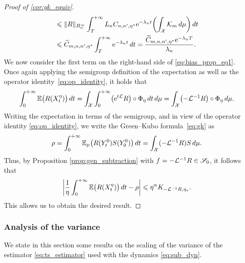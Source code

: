 \begin{proof}[Proof of \cref{cor:gk_equiv}]
\begin{align}
		&\leq \norm{R}_{B^\infty_n}\int_T^{+\infty} L_n C_{n,n',\eta^*} \e^{-\lambda_n t} \paren*{\int_\mathcal{X} \mathcal{K}_m \, d\mu} \, dt \\
		&\leq \widetilde{C}_{m,n,n',\eta^*}\int_T^{+\infty} \e^{-\lambda_n t} \, dt %
		= \frac{\widetilde{C}_{m,n,n',\eta^*}\e^{-\lambda_n T}}{\lambda_n}. %
	\end{align}
	We now consider the first term on the right-hand side of \eqref{eq:bias_prop_eq1}. 
	Once again applying the semigroup definition of the expectation as well as the operator identity~\eqref{eq:op_identity}, it holds that
	\begin{align}
		\int_0^{+\infty} \E\bigl(R(X^\eta_t)\bigr) \, dt %
		= \int_\mathcal{X}\int_0^{+\infty} \bigl(\e^{t\L}R\bigr)\circ \Phi_\eta \, dt \, d\mu
		= \int_\mathcal{X} \bigl(-\L^{-1}R\bigr)\circ \Phi_\eta \, d\mu.
		\label{eq:cor_Tint_to_LinvR}
	\end{align}
	Writing the expectation in terms of the semigroup, and in view of the operator identity \eqref{eq:op_identity}, we write the Green--Kubo formula~\eqref{eq:gk} as
	\begin{align}
		\rho = \int_0^{+\infty} \mathbb{E}_\mu\bigl(R(Y_t^0)S(Y_0^0)\bigr) \, dt = \int_\mathcal{X} (-\mathcal{L}^{-1}R)S \, d\mu.
	\end{align}
	Thus, by Proposition \ref{prop:gen_subtraction} with $f = -\mathcal{L}^{-1}R \in \mathscr{S}_0$, it follows that
	\begin{equation}
		\abs*{\frac{1}{\eta}\int_0^{+\infty} \E\bigl(R(X^\eta_t)\bigr) \, dt - \rho} \leq \eta^{\alpha} K_{-\L^{-1}R,\eta_*}.
		\label{eq:cor_eta_bias}
	\end{equation}
	This allows us to obtain the desired result.
\end{proof}

\subsubsection{Analysis of the variance}
\label{subsubsec:variance_analysis}
We state in this section some results on the scaling of the variance of the estimator \eqref{eq:ts_estimator} used with the dynamics \eqref{eq:sub_dyn}.

